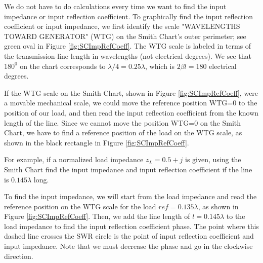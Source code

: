 \documentclass{ximera}
\begin{document}
We do not have to do calculations every time we want to find the input impedance or input reflection coefficient. To graphically find the input reflection coefficient or input impedance, we first identify the scale "WAVELENGTHS TOWARD GENERATOR" (WTG) on the Smith Chart's outer perimeter; see green oval in Figure \ref{fig:SCImpRefCoeff}.  The WTG scale is labeled in terms of the transmission-line length in wavelengths (not electrical degrees). We see that $180^0$ on the chart corresponds to $\lambda/4=0.25\lambda$, which is $2 \beta l =180$ electrical degrees. 

If the WTG scale on the Smith Chart, shown in Figure \ref{fig:SCImpRefCoeff}, were a movable mechanical scale, we could move the reference position WTG=0 to the position of our load, and then read the input reflection coefficient from the known length of the line. Since we cannot move the position WTG=0  on the Smith Chart,  we have to find a reference position of the load on the WTG scale, as shown in the black rectangle in Figure \ref{fig:SCImpRefCoeff}. 

For example, if a normalized load impedance $z_L=0.5+j$ is given, using the Smith Chart find the input impedance and input reflection coefficient if the line is $0.145 \lambda$ long.

To find the input impedance, we will start from the load impedance and read the reference position on the WTG scale for the load $ref=0.135\lambda$, as shown in Figure \ref{fig:SCImpRefCoeff}. Then, we add the line length of $l=0.145\lambda$ to the load impedance to find the input reflection coefficient phase. The point where this dashed line crosses the SWR circle is the point of input reflection coefficient and input impedance. Note that we must decrease the phase and go in the clockwise direction.
\end{document}
